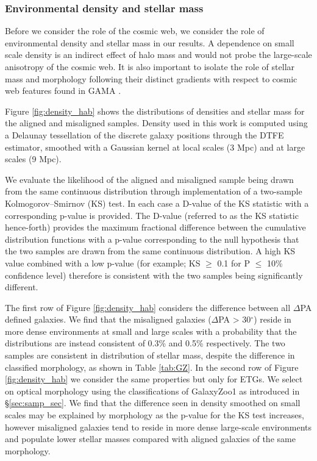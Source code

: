 \subsubsection{Environmental density and stellar mass}
Before we consider the role of the cosmic web, we consider the role of environmental density and stellar mass in our results. A dependence on small scale density is an indirect effect of halo mass and would not probe the large-scale anisotropy of the cosmic web. It is also important to isolate the role of stellar mass and morphology following their distinct gradients with respect to cosmic web features found in GAMA \citep{kraljic2018}.

Figure \ref{fig:density_hab} shows the distributions of densities and stellar mass for the aligned and misaligned samples. Density used in this work is computed using a Delaunay tessellation of the discrete galaxy positions through the DTFE estimator, smoothed with a Gaussian kernel at local scales (3 Mpc) and at large scales (9 Mpc). 

We evaluate the likelihood of the aligned and misaligned sample being drawn from the same continuous distribution through implementation of a two-sample Kolmogorov--Smirnov (KS) test. In each case a D-value of the KS statistic with a corresponding p-value is provided. The D-value (referred to as the KS statistic hence-forth) provides the maximum fractional difference between the cumulative distribution functions with a p-value corresponding to the null hypothesis that the two samples are drawn from the same continuous distribution. A high KS value combined with a low p-value (for example; KS $\geq$ 0.1 for P $\leq$ 10\% confidence level) therefore is consistent with the two samples being significantly different.

The first row of Figure \ref{fig:density_hab} considers the difference between all $\Delta$PA defined galaxies. We find that the misaligned galaxies ($\Delta$PA > 30$^{\circ}$) reside in more dense environments at small and large scales with a probability that the distributions are instead consistent of 0.3\% and 0.5\% respectively. The two samples are consistent in distribution of stellar mass, despite the difference in classified morphology, as shown in Table \ref{tab:GZ}. In the second row of Figure \ref{fig:density_hab} we consider the same properties but only for ETGs. We select on optical morphology using the classifications of GalaxyZoo1 as introduced in \S\ref{sec:samp_sec}. We find that the difference seen in density smoothed on small scales may be explained by morphology as the p-value for the KS test increases, however misaligned galaxies tend to reside in more dense large-scale environments and populate lower stellar masses compared with aligned galaxies of the same morphology.

